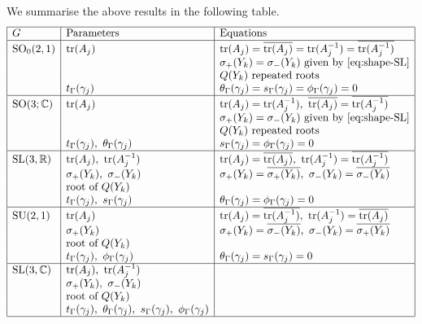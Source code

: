 \documentclass[11pt]{amsart}
\numberwithin{equation}{section}
\begin{document}
We summarise the above results in the following table.
$$
\begin{array}{|l|l|l|}
\hline
G & \hbox{Parameters} & \hbox{Equations} \\
\hline
{\rm SO}_0(2,1) & {\rm tr}(A_j) & {\rm tr}(A_j)=\overline{{\rm tr}(A_j)}={\rm tr}(A_j^{-1})=\overline{{\rm tr}(A_j^{-1})} \\
& & \sigma_+(Y_k)=\sigma_-(Y_k) \hbox{ given by }\eqref{eq:shape-SL}  \\
& & Q(Y_k)\hbox{ repeated roots} \\
& t_\Gamma(\gamma_j) & \theta_\Gamma(\gamma_j)=s_\Gamma(\gamma_j)=\phi_\Gamma(\gamma_j)=0 \\
\hline
{\rm SO}(3;{\mathbb C}) & {\rm tr}(A_j) & {\rm tr}(A_j)={\rm tr}(A_j^{-1}),\ \overline{{\rm tr}(A_j)}=\overline{{\rm tr}(A_j^{-1})} \\
& & \sigma_+(Y_k)=\sigma_-(Y_k)\hbox{ given by }\eqref{eq:shape-SL}  \\
& & Q(Y_k) \hbox{ repeated roots} \\
& t_\Gamma(\gamma_j),\  \theta_\Gamma(\gamma_j) & s_\Gamma(\gamma_j)=\phi_\Gamma(\gamma_j)=0 \\
\hline
{\rm SL}(3,{\mathbb R}) & {\rm tr}(A_j) ,\ {\rm tr}(A_j^{-1}) & 
{\rm tr}(A_j)=\overline{{\rm tr}(A_j)}, \ {\rm tr}(A_j^{-1})=\overline{{\rm tr}(A_j^{-1})} \\
& \sigma_+(Y_k),\ \sigma_-(Y_k) & \sigma_+(Y_k)=\overline{\sigma_+(Y_k)},\ 
\sigma_-(Y_k)=\overline{\sigma_-(Y_k)} \\
& \hbox{root of }Q(Y_k) & \\
& t_\Gamma(\gamma_j),\ s_\Gamma(\gamma_j) & \theta_\Gamma(\gamma_j)=\phi_\Gamma(\gamma_j)=0 \\
\hline
{\rm SU}(2,1) & {\rm tr}(A_j) & {\rm tr}(A_j)=\overline{{\rm tr}(A_j^{-1})},\  {\rm tr}(A_j^{-1})=\overline{{\rm tr}(A_j)} \\
& \sigma_+(Y_k)  &  \sigma_+(Y_k)=\overline{\sigma_-(Y_k)},\ 
\sigma_-(Y_k)=\overline{\sigma_+(Y_k)} \\
& \hbox{root of }Q(Y_k) &  \\
& t_\Gamma(\gamma_j), \ \phi_\Gamma(\gamma_j) & \theta_\Gamma(\gamma_j)=s_\Gamma(\gamma_j)=0 \\
\hline
{\rm SL}(3,{\mathbb C}) & {\rm tr}(A_j),\ {\rm tr}(A_j^{-1}) & \\
& \sigma_+(Y_k),\ \sigma_-(Y_k) & \\
& \hbox{root of }Q(Y_k) &  \\
& t_\Gamma(\gamma_j),\  \theta_\Gamma(\gamma_j), \ s_\Gamma(\gamma_j), \ \phi_\Gamma(\gamma_j) & \\
\hline
\end{array}
$$
\end{document}
